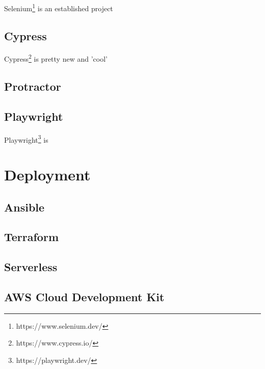 Selenium\footnote{https://www.selenium.dev/} is an established project

\subsection{Cypress}

Cypress\footnote{https://www.cypress.io/} is pretty new and 'cool' 

\subsection{Protractor}

\subsection{Playwright}

Playwright\footnote{https://playwright.dev/} is


\section{Deployment}

\subsection{Ansible}
\subsection{Terraform}
\subsection{Serverless}
\subsection{AWS Cloud Development Kit}
